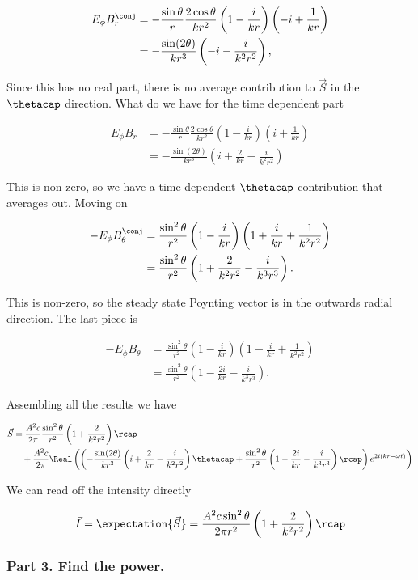 \begin{align*}
E_\phi B_r^\conj &=
- \frac{\sin\theta}{r} \frac{2 \cos\theta}{k r^2} 
\left( 1 - \frac{i}{kr} \right)
\left( -i + \frac{1}{kr} \right) \\
&=
-\frac{ \sin(2\theta)}{k r^3}
\left( -i - \frac{i}{k^2 r^2} \right),
\end{align*}

Since this has no real part, there is no average contribution to $\vec{S}$ in the $\thetacap$ direction.  What do we have for the time dependent part

\begin{align*}
E_\phi B_r &=
- \frac{\sin\theta}{r} \frac{2 \cos\theta}{k r^2} 
\left( 1 - \frac{i}{kr} \right)
\left( i + \frac{1}{kr} \right) \\
&=
-\frac{ \sin(2\theta)}{k r^3}
\left( i + \frac{2}{kr} - \frac{i}{k^2 r^2} \right) 
\end{align*}

This is non zero, so we have a time dependent $\thetacap$ contribution that averages out.  Moving on

\begin{align*}
- E_\phi B_\theta^\conj
&= 
\frac{\sin^2\theta}{r^2} 
\left( 1 - \frac{i}{kr} \right)
\left( 1 + \frac{i}{kr} + \frac{1}{k^2 r^2} \right) \\
&= 
\frac{\sin^2\theta}{r^2} 
\left( 1 + \frac{2}{k^2 r^2} - \frac{i}{k^3 r^3}\right).
\end{align*}

This is non-zero, so the steady state Poynting vector is in the outwards radial direction.  The last piece is

\begin{align*}
- E_\phi B_\theta
&= 
\frac{\sin^2\theta}{r^2} 
\left( 1 - \frac{i}{kr} \right)
\left( 1 - \frac{i}{kr} + \frac{1}{k^2 r^2} \right) \\
&= 
\frac{\sin^2\theta}{r^2} 
\left( 1 - \frac{2i}{k r} - \frac{i}{k^3 r^3}\right).
\end{align*}

Assembling all the results we have

\begin{align*}
\begin{aligned}
\vec{S} 
&= 
\frac{A^2 c}{2 \pi} 
\frac{\sin^2\theta}{r^2} 
\left( 1 + \frac{2}{k^2 r^2} \right) \rcap \\
&\quad +
\frac{A^2 c}{2 \pi} 
\Real \left(
\left(
-\frac{ \sin(2\theta)}{k r^3} \left( i + \frac{2}{kr} - \frac{i}{k^2 r^2} \right) \thetacap
+\frac{\sin^2\theta}{r^2} \left( 1 - \frac{2i}{k r} - \frac{i}{k^3 r^3}\right) \rcap 
\right) e^{ 2 i ( k r - \omega t ) }
\right) 
\end{aligned}
\end{align*}

We can read off the intensity directly

\begin{equation}\label{eqn:relElectroDynProblemSet4:680}
\vec{I} = \expectation{\vec{S}} = 
\frac{A^2 c \sin^2 \theta}{2 \pi r^2} 
\left( 1 + \frac{2}{k^2 r^2} \right) \rcap 
\end{equation}

\subsubsection{Part 3.  Find the power.}
